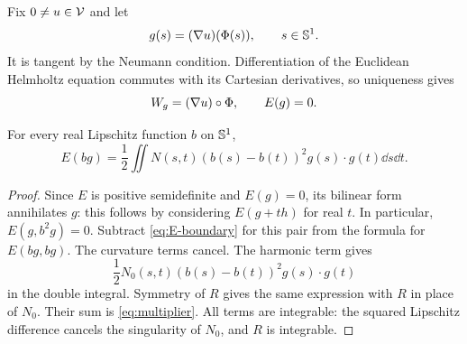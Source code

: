Fix $0\ne u\in\mathcal V$ and let
\begin{equation}\label{eq:g}
g(s)=(\nabla u)(\Phi(s)),\qquad s\in\mathbb S^1.
\end{equation}
It is tangent by the Neumann condition. Differentiation of the Euclidean Helmholtz equation commutes with its Cartesian derivatives, so uniqueness gives
\begin{equation}\label{eq:gradient-extension}
W_g=(\nabla u)\circ\Phi,
\qquad E(g)=0.
\end{equation}

\begin{proposition}\label{prop:multiplier}
For every real Lipschitz function $b$ on $\mathbb S^1$,
\begin{equation}\label{eq:multiplier}
E(bg)=\frac12\iint N(s,t)(b(s)-b(t))^2
g(s)\cdot g(t)\dd s\dd t.
\end{equation}
\end{proposition}
\begin{proof}
Since $E$ is positive semidefinite and $E(g)=0$, its bilinear form annihilates $g$: this follows by considering $E(g+th)$ for real $t$. In particular, $E(g,b^2g)=0$. Subtract \eqref{eq:E-boundary} for this pair from the formula for $E(bg,bg)$. The curvature terms cancel. The harmonic term gives
\[
\frac12N_0(s,t)(b(s)-b(t))^2g(s)\cdot g(t)
\]
in the double integral. Symmetry of $R$ gives the same expression with $R$ in place of $N_0$. Their sum is \eqref{eq:multiplier}. All terms are integrable: the squared Lipschitz difference cancels the singularity of $N_0$, and $R$ is integrable.
\end{proof}
